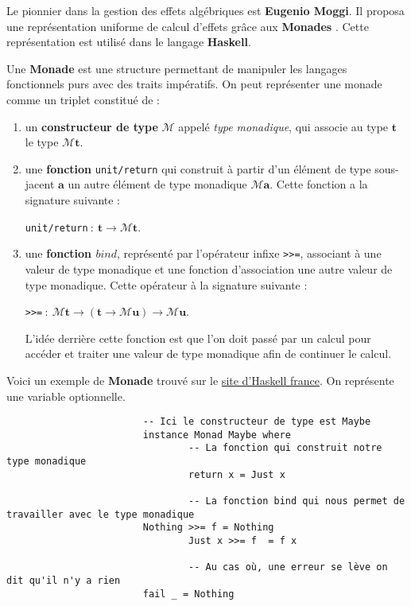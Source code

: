 	Le pionnier dans la gestion des effets algébriques est \textbf{Eugenio Moggi}. Il proposa une représentation uniforme de calcul d'effets grâce aux \textbf{Monades} \cite{DBLP:conf/ac/BentonHM00}. 
	Cette représentation est utilisé dans le langage \textbf{Haskell}.
	
	\begin{definition}
		Une \textbf{Monade} est une structure permettant de manipuler les langages fonctionnels purs
		avec des traits impératifs.
		On peut représenter une monade comme un triplet constitué de : 
		\begin{enumerate}
			\item un \textbf{constructeur de type} $\mathcal{M}$ appelé \textit{type monadique}, qui associe au type $\textbf{t}$ le type $\mathcal{M}\textbf{t}$.
			\item une \textbf{fonction} \verb|unit/return| qui construit à partir d'un élément de type 
			sous-jacent $\textbf{a}$ un autre élément de type monadique $\mathcal{M}\textbf{a}$. Cette fonction a la signature suivante : 
			
			\verb|unit/return|$~:~\textbf{t} \rightarrow \mathcal{M}\textbf{t}$.
			\item une \textbf{fonction $bind$}, représenté par l'opérateur infixe \verb|>>=|, associant à une valeur de type monadique
			et une fonction d'association une autre valeur de type monadique. Cette opérateur à la signature suivante : 
			
			\verb|>>=|$~:~\mathcal{M}\textbf{t} \rightarrow (\textbf{t} \rightarrow \mathcal{M}\textbf{u}) \rightarrow \mathcal{M}\textbf{u}$.
			
			L'idée derrière cette fonction est que l'on doit passé par un calcul pour accéder et traiter une valeur de type monadique afin de continuer le calcul.
		\end{enumerate}
	\end{definition}
	\bigbreak

	\begin{exemple} Voici un exemple de \textbf{Monade} trouvé sur le \href{http://lyah.haskell.fr/pour-une-poignee-de-monades}{site d'Haskell france}. On représente 
		une variable optionnelle.
		\begin{verbatim}
						-- Ici le constructeur de type est Maybe
						instance Monad Maybe where
						        -- La fonction qui construit notre type monadique
						        return x = Just x
						
						        -- La fonction bind qui nous permet de travailler avec le type monadique
				        Nothing >>= f = Nothing
						        Just x >>= f  = f x
								
						        -- Au cas où, une erreur se lève on dit qu'il n'y a rien
				        fail _ = Nothing
		\end{verbatim}
	\end{exemple}
	\bigbreak
	

